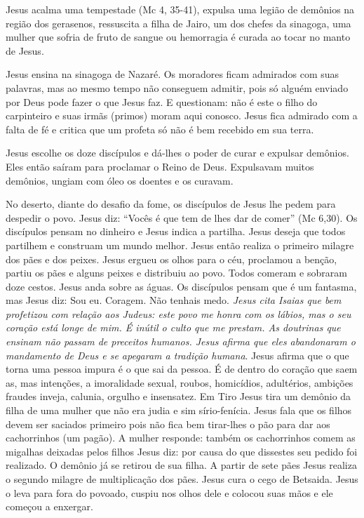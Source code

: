 \documentclass[
]{book}
\begin{document}
Jesus acalma uma tempestade (Mc 4, 35-41), expulsa uma legião de demônios na região dos gerasenos, ressuscita a filha de Jairo, um dos chefes da sinagoga, uma mulher que sofria de fruto de sangue ou hemorragia é curada ao tocar no manto de Jesus.

Jesus ensina na sinagoga de Nazaré. Os moradores ficam admirados com suas palavras, mas ao mesmo tempo não conseguem admitir, pois só alguém enviado por Deus pode fazer o que Jesus faz. E questionam: não é este o filho do carpinteiro e suas irmãs (primos) moram aqui conosco. Jesus fica admirado com a falta de fé e critica que um profeta só não é bem recebido em sua terra.

Jesus escolhe os doze discípulos e dá-lhes o poder de curar e expulsar demônios. Eles então saíram para proclamar o Reino de Deus. Expulsavam muitos demônios, ungiam com óleo os doentes e os curavam.

No deserto, diante do desafio da fome, os discípulos de Jesus lhe pedem para despedir o povo. Jesus diz: ``Vocês é que tem de lhes dar de comer'' (Mc 6,30). Os discípulos pensam no dinheiro e Jesus indica a partilha. Jesus deseja que todos partilhem e construam um mundo melhor. Jesus então realiza o primeiro milagre dos pães e dos peixes. Jesus ergueu os olhos para o céu, proclamou a benção, partiu os pães e alguns peixes e distribuiu ao povo. Todos comeram e sobraram doze cestos. Jesus anda sobre as águas. Os discípulos pensam que é um fantasma, mas Jesus diz: Sou eu. Coragem. Não tenhais medo. \emph{Jesus cita Isaias que bem profetizou com relação aos Judeus: este povo me honra com os lábios, mas o seu coração está longe de mim. É inútil o culto que me prestam. As doutrinas que ensinam não passam de preceitos humanos. Jesus afirma que eles abandonaram o mandamento de Deus e se apegaram a tradição humana}. Jesus afirma que o que torna uma pessoa impura é o que sai da pessoa. É de dentro do coração que saem as, mas intenções, a imoralidade sexual, roubos, homicídios, adultérios, ambições fraudes inveja, calunia, orgulho e insensatez. Em Tiro Jesus tira um demônio da filha de uma mulher que não era judia e sim sírio-fenícia. Jesus fala que os filhos devem ser saciados primeiro pois não fica bem tirar-lhes o pão para dar aos cachorrinhos (um pagão). A mulher responde: também os cachorrinhos comem as migalhas deixadas pelos filhos Jesus diz: por causa do que dissestes seu pedido foi realizado. O demônio já se retirou de sua filha. A partir de sete pães Jesus realiza o segundo milagre de multiplicação dos pães. Jesus cura o cego de Betsaida. Jesus o leva para fora do povoado, cuspiu nos olhos dele e colocou suas mãos e ele começou a enxergar.
\end{document}
